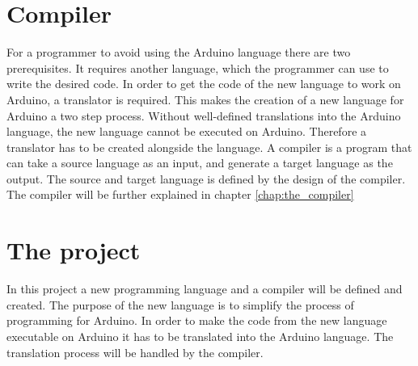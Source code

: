 \section{Compiler}
For a programmer to avoid using the Arduino language there are two prerequisites. It requires another language, which the programmer can use to write the desired code. In order to get the code of the new language to work on Arduino, a translator is required. This makes the creation of a new language for Arduino a two step process. Without well-defined translations into the Arduino language, the new language cannot be executed on Arduino. Therefore a translator has to be created alongside the language.
A compiler is a program that can take a source language as an input, and generate a target language as the output. The source and target language is defined by the design of the compiler. The compiler will be further explained in chapter \ref{chap:the_compiler} 

\section{The project}
In this project a new programming language and a compiler will be defined and created. The purpose of the new language is to simplify the process of programming for Arduino. In order to make the code from the new language executable on Arduino it has to be translated into the Arduino language. The translation process will be handled by the compiler. 